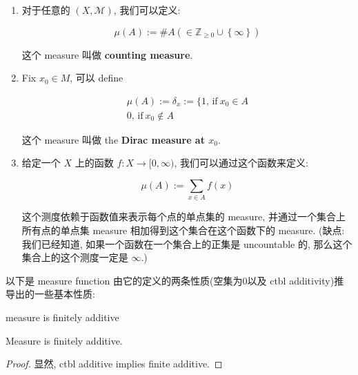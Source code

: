 \documentclass{qlnotes-export}
\begin{document}
\begin{example}\label{ex-01-sigma-algebra-measure-example-003}

\begin{enumerate}
\item
  对于任意的 \((X,\mathcal{M})\), 我们可以定义:

  \[\mu(A) := \# A( \in {\mathbb{Z}}_{\geq 0} \cup \left\{ \infty \right\})\]

  这个 measure 叫做 \textbf{counting measure}.
\item
  Fix \(x_{0} \in M\), 可以 define

  \[\begin{matrix}
  {\mu(A) := \delta_{x} := \{ 1\text{, if}\ x_{0} \in A} \\
  {0\text{, if}\ x_{0} \notin A}
  \end{matrix}\]

  这个 measure 叫做 the \textbf{Dirac measure at \(x_{0}\)}.
\item
  给定一个 \(X\) 上的函数 \(f:X\rightarrow\lbrack 0,\infty)\), 我们可以通过这个函数来定义:

  \[\mu(A) := \sum\limits_{x \in A}f(x)\]

  这个测度依赖于函数值来表示每个点的单点集的 measure, 并通过一个集合上所有点的单点集 measure 相加得到这个集合在这个函数下的 measure. (缺点: 我们已经知道, 如果一个函数在一个集合上的正集是 uncountable 的, 那么这个集合上的这个测度一定是 \(\infty\).)
\end{enumerate}

\end{example}

以下是 measure function 由它的定义的两条性质(空集为0以及 ctbl additivity)推导出的一些基本性质:

\begin{lemma}{measure is finitely additive}\label{lem-01-sigma-algebra-measure-measure-is-finitely-additive}

Measure is finitely additive.

\end{lemma}

\begin{proof}

显然, ctbl additive implies finite additive.

\end{proof}
\end{document}
